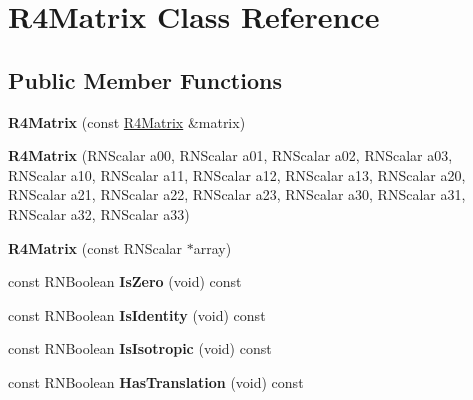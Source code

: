 \hypertarget{class_r4_matrix}{}\section{R4\+Matrix Class Reference}
\label{class_r4_matrix}
\subsection*{Public Member Functions}
\begin{DoxyCompactItemize}
\item 
{\bfseries R4\+Matrix} (const \hyperlink{class_r4_matrix}{R4\+Matrix} \&matrix)\hypertarget{class_r4_matrix_aed362c59728bbe61fa8fe3a27d110bb4}{}\label{class_r4_matrix_aed362c59728bbe61fa8fe3a27d110bb4}

\item 
{\bfseries R4\+Matrix} (R\+N\+Scalar a00, R\+N\+Scalar a01, R\+N\+Scalar a02, R\+N\+Scalar a03, R\+N\+Scalar a10, R\+N\+Scalar a11, R\+N\+Scalar a12, R\+N\+Scalar a13, R\+N\+Scalar a20, R\+N\+Scalar a21, R\+N\+Scalar a22, R\+N\+Scalar a23, R\+N\+Scalar a30, R\+N\+Scalar a31, R\+N\+Scalar a32, R\+N\+Scalar a33)\hypertarget{class_r4_matrix_af759ac34b7767f88013c1bafaeedea87}{}\label{class_r4_matrix_af759ac34b7767f88013c1bafaeedea87}

\item 
{\bfseries R4\+Matrix} (const R\+N\+Scalar $\ast$array)\hypertarget{class_r4_matrix_a1bd399c78029fe9d2a28f284c8749c09}{}\label{class_r4_matrix_a1bd399c78029fe9d2a28f284c8749c09}

\item 
const R\+N\+Boolean {\bfseries Is\+Zero} (void) const \hypertarget{class_r4_matrix_adbbf4f9841cbb16f4f2d10bd323ae614}{}\label{class_r4_matrix_adbbf4f9841cbb16f4f2d10bd323ae614}

\item 
const R\+N\+Boolean {\bfseries Is\+Identity} (void) const \hypertarget{class_r4_matrix_a3ad1697ee4fe2c7cb5b2d1d7c5ea77f1}{}\label{class_r4_matrix_a3ad1697ee4fe2c7cb5b2d1d7c5ea77f1}

\item 
const R\+N\+Boolean {\bfseries Is\+Isotropic} (void) const \hypertarget{class_r4_matrix_a93e457f1ab253c7a4575268a84c047f3}{}\label{class_r4_matrix_a93e457f1ab253c7a4575268a84c047f3}

\item 
const R\+N\+Boolean {\bfseries Has\+Translation} (void) const \hypertarget{class_r4_matrix_ac923cc9eaadf6875a97d110aa75fd920}{}\label{class_r4_matrix_ac923cc9eaadf6875a97d110aa75fd920}


\end{DoxyCompactItemize}
